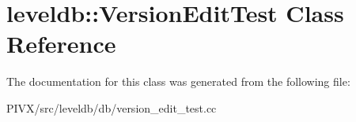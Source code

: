 \hypertarget{classleveldb_1_1_version_edit_test}{}\section{leveldb\+:\+:Version\+Edit\+Test Class Reference}
\label{classleveldb_1_1_version_edit_test}


The documentation for this class was generated from the following file\+:\begin{DoxyCompactItemize}
\item 
P\+I\+V\+X/src/leveldb/db/version\+\_\+edit\+\_\+test.\+cc\end{DoxyCompactItemize}

